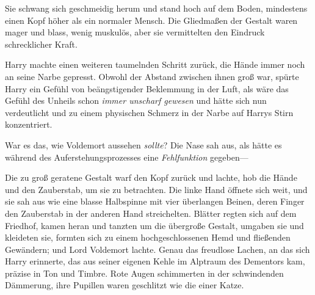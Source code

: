 Sie schwang sich geschmeidig herum und stand hoch auf dem Boden, mindestens einen Kopf höher als ein normaler Mensch. Die Gliedmaßen der Gestalt waren mager und blass, wenig muskulös, aber sie vermittelten den Eindruck schrecklicher Kraft.

Harry machte einen weiteren taumelnden Schritt zurück, die Hände immer noch an seine Narbe gepresst. Obwohl der Abstand zwischen ihnen groß war, spürte Harry ein Gefühl von beängstigender Beklemmung in der Luft, als wäre das Gefühl des Unheils schon \emph{immer unscharf gewesen} und hätte sich nun verdeutlicht und zu einem physischen Schmerz in der Narbe auf Harrys Stirn konzentriert.

War es das, wie Voldemort aussehen \emph{sollte}? Die Nase sah aus, als hätte es während des Auferstehungsprozesses eine \emph{Fehlfunktion} gegeben—

Die zu groß geratene Gestalt warf den Kopf zurück und lachte, hob die Hände und den Zauberstab, um sie zu betrachten. Die linke Hand öffnete sich weit, und sie sah aus wie eine blasse Halbspinne mit vier überlangen Beinen, deren Finger den Zauberstab in der anderen Hand streichelten. Blätter regten sich auf dem Friedhof, kamen heran und tanzten um die übergroße Gestalt, umgaben sie und kleideten sie, formten sich zu einem hochgeschlossenen Hemd und fließenden Gewändern; und Lord Voldemort lachte. Genau das freudlose Lachen, an das sich Harry erinnerte, das aus seiner eigenen Kehle im Alptraum des Dementors kam, präzise in Ton und Timbre.
Rote Augen schimmerten in der schwindenden Dämmerung, ihre Pupillen waren geschlitzt wie die einer Katze.

